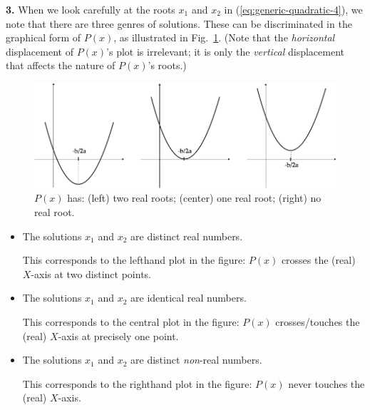 \smallskip

{\bf 3.}
When we look carefully at the roots $x_1$ and $x_2$ in
(\ref{eq:generic-quadratic-4}), we note that there are three genres of
solutions.  These can be discriminated in the graphical form of
$P(x)$, as illustrated in Fig.~\ref{fig:SecondDegreeInit}.  (Note that
the {\em horizontal} displacement of $P(x)$'s plot is irrelevant; it
is only the {\em vertical} displacement that affects the nature of
$P(x)$'s roots.)
\begin{figure}[htb]
\begin{center}
       \includegraphics[scale=0.325]{FiguresArithmetic/SecondDegreeInit}
\caption{$P(x)$ has: (left) two real roots; (center) one real root;
  (right) no real root.}
\label{fig:SecondDegreeInit}
\end{center}
\end{figure}
\begin{itemize}
\item
The solutions $x_1$ and $x_2$ are distinct real numbers.

This corresponds to the lefthand plot in the figure: $P(x)$ crosses
the (real) $X$-axis at two distinct points.

\item
The solutions $x_1$ and $x_2$ are identical real numbers.

This corresponds to the central plot in the figure: $P(x)$
crosses/touches the (real) $X$-axis at precisely one point.

\item
The solutions $x_1$ and $x_2$ are distinct {\em non}-real numbers.

This corresponds to the righthand plot in the figure: $P(x)$ never
touches the (real) $X$-axis.
\end{itemize}

